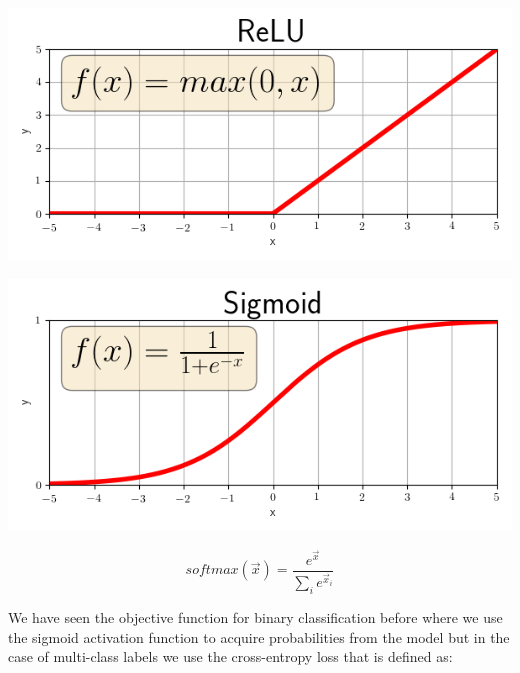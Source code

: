 \documentclass[a4paper,12pt]{article}
\begin{document}
\begin{minipage}[t]{0.45\textwidth}
    \centering
    \includegraphics[width=\textwidth]{relu.png}
    \label{fig:relu}
\end{minipage}
\begin{minipage}[t]{0.45\textwidth}
    \centering
    \includegraphics[width=\textwidth]{sigmoid.png}
    \label{fig:sigmoid}
\end{minipage}

\vspace{4mm}

\begin{equation}
    softmax(\vec{x}) = \frac{e^{\vec{x}}}{\sum_{i}e^{\vec{x}_i}}
\end{equation}

\vspace{4mm}

\par We have seen the objective function for binary classification before where we use the sigmoid activation function to acquire probabilities from the model but in the case of multi-class labels we use the cross-entropy loss that is defined as:

\vspace{4mm}
\end{document}

